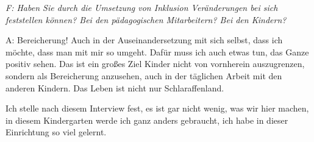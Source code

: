 \emph{F: Haben Sie durch die Umsetzung von Inklusion Veränderungen bei sich feststellen können? Bei den pädagogischen Mitarbeitern? Bei den Kindern?} 

A: Bereicherung! Auch in der Auseinandersetzung mit sich selbst, dass ich möchte, dass man mit mir so umgeht. Dafür muss ich auch etwas tun, das Ganze positiv sehen. Das ist ein großes Ziel Kinder nicht von vornherein auszugrenzen, sondern als Bereicherung anzusehen, auch in der täglichen Arbeit mit den anderen Kindern. Das Leben ist nicht nur Schlaraffenland. 

Ich stelle nach diesem Interview fest, es ist gar nicht wenig, was wir hier machen, in diesem Kindergarten werde ich ganz anders gebraucht,  ich habe in dieser Einrichtung so viel gelernt. 

